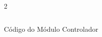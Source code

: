 \begin{figure}[H]
    \centering   
    \begin{tcolorbox}  
        \begin{multicols}{2} 
        \fontsize{9pt}{9pt}\selectfont\inputminted[obeytabs=true,tabsize=4,xleftmargin=20pt,linenos,breaklines]{VHDL}{VHDL/files/Controller.vhd}    
        \end{multicols}
    \end{tcolorbox}
    \caption{Código do Módulo Controlador}
\end{figure}